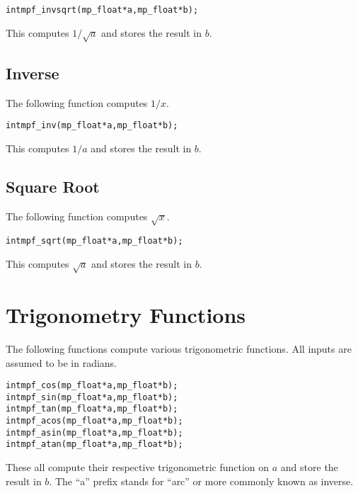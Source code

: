 \documentclass[b5paper]{book}
\begin{document}
\begin{alltt}
int  mpf_invsqrt(mp_float *a, mp_float *b);
\end{alltt}

This computes $1 / \sqrt{a}$ and stores the result in $b$.

\subsection{Inverse}

The following function computes $1 / x$.
\begin{alltt}
int  mpf_inv(mp_float *a, mp_float *b);
\end{alltt}
This computes $1/a$ and stores the result in $b$.


\subsection{Square Root}

The following function computes $\sqrt{x}$.

\begin{alltt}
int  mpf_sqrt(mp_float *a, mp_float *b);
\end{alltt}

This computes $\sqrt{a}$ and stores the result in $b$.

\section{Trigonometry Functions}
The following functions compute various trigonometric functions.  All inputs are assumed to be in radians.

      
\begin{alltt}
int  mpf_cos(mp_float *a, mp_float *b);
int  mpf_sin(mp_float *a, mp_float *b);
int  mpf_tan(mp_float *a, mp_float *b);
int  mpf_acos(mp_float *a, mp_float *b);
int  mpf_asin(mp_float *a, mp_float *b);
int  mpf_atan(mp_float *a, mp_float *b);
\end{alltt}

These all compute their respective trigonometric function on $a$ and store the result in $b$.  The ``a'' prefix stands for ``arc'' or more
commonly known as inverse.  


\end{document}
